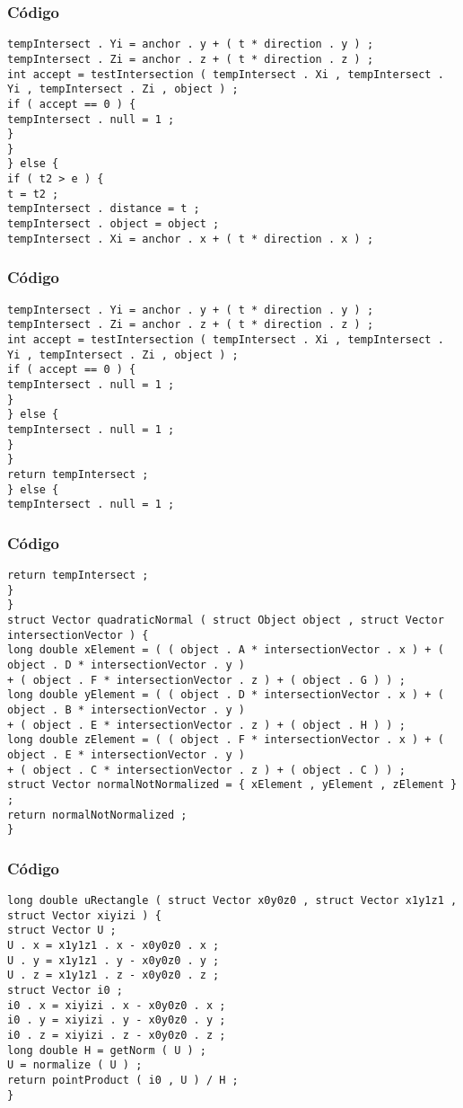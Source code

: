 \documentclass{beamer}
\begin{document}
\begin{frame}[fragile]
\frametitle{C\'odigo}
\begin{verbatim}
tempIntersect . Yi = anchor . y + ( t * direction . y ) ; 
tempIntersect . Zi = anchor . z + ( t * direction . z ) ; 
int accept = testIntersection ( tempIntersect . Xi , tempIntersect . Yi , tempIntersect . Zi , object ) ; 
if ( accept == 0 ) { 
tempIntersect . null = 1 ; 
} 
} 
} else { 
if ( t2 > e ) { 
t = t2 ; 
tempIntersect . distance = t ; 
tempIntersect . object = object ; 
tempIntersect . Xi = anchor . x + ( t * direction . x ) ; 
\end{verbatim}
\end{frame}
\begin{frame}[fragile]
\frametitle{C\'odigo}
\begin{verbatim}
tempIntersect . Yi = anchor . y + ( t * direction . y ) ; 
tempIntersect . Zi = anchor . z + ( t * direction . z ) ; 
int accept = testIntersection ( tempIntersect . Xi , tempIntersect . Yi , tempIntersect . Zi , object ) ; 
if ( accept == 0 ) { 
tempIntersect . null = 1 ; 
} 
} else { 
tempIntersect . null = 1 ; 
} 
} 
return tempIntersect ; 
} else { 
tempIntersect . null = 1 ; 
\end{verbatim}
\end{frame}
\begin{frame}[fragile]
\frametitle{C\'odigo}
\begin{verbatim}
return tempIntersect ; 
} 
} 
struct Vector quadraticNormal ( struct Object object , struct Vector intersectionVector ) { 
long double xElement = ( ( object . A * intersectionVector . x ) + ( object . D * intersectionVector . y ) 
+ ( object . F * intersectionVector . z ) + ( object . G ) ) ; 
long double yElement = ( ( object . D * intersectionVector . x ) + ( object . B * intersectionVector . y ) 
+ ( object . E * intersectionVector . z ) + ( object . H ) ) ; 
long double zElement = ( ( object . F * intersectionVector . x ) + ( object . E * intersectionVector . y ) 
+ ( object . C * intersectionVector . z ) + ( object . C ) ) ; 
struct Vector normalNotNormalized = { xElement , yElement , zElement } ; 
return normalNotNormalized ; 
} 
\end{verbatim}
\end{frame}
\begin{frame}[fragile]
\frametitle{C\'odigo}
\begin{verbatim}
long double uRectangle ( struct Vector x0y0z0 , struct Vector x1y1z1 , struct Vector xiyizi ) { 
struct Vector U ; 
U . x = x1y1z1 . x - x0y0z0 . x ; 
U . y = x1y1z1 . y - x0y0z0 . y ; 
U . z = x1y1z1 . z - x0y0z0 . z ; 
struct Vector i0 ; 
i0 . x = xiyizi . x - x0y0z0 . x ; 
i0 . y = xiyizi . y - x0y0z0 . y ; 
i0 . z = xiyizi . z - x0y0z0 . z ; 
long double H = getNorm ( U ) ; 
U = normalize ( U ) ; 
return pointProduct ( i0 , U ) / H ; 
} 
\end{verbatim}
\end{frame}
\end{document}
